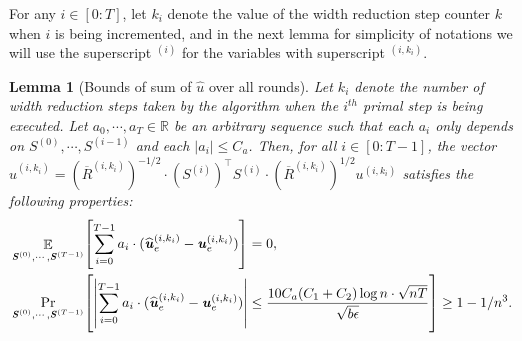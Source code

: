 \documentclass[11pt]{article}
\newtheorem{lemma}[theorem]{Lemma}
\let\originalleft\left
\let\originalright\right
\renewcommand{\left}{\mathopen{}\mathclose\bgroup\originalleft}
\renewcommand{\right}{\aftergroup\egroup\originalright}
\newcommand\uu{\boldsymbol{\mathit{u}}}
\renewcommand\SS{\boldsymbol{\mathit{S}}}
\newcommand\RRbar{\boldsymbol{\overline{\mathit{R}}}}
\newcommand{\wh}{\widehat}
\newcommand\R{\mathbb{R}}
\DeclareMathOperator*{\E}{{\mathbb{E}}}
\begin{document}
For any $i \in [0:T]$, let $k_i$ denote the value of the width reduction step counter $k$ when $i$ is being incremented, and in the next lemma for simplicity of notations we will use the superscript $^{(i)}$ for the variables with superscript $^{(i,k_i)}$.
\begin{lemma}[Bounds of sum of $\wh{\uu}$ over all rounds]\label{lem:sum_hat_u}
Let $k_i$ denote the number of width reduction steps taken by the algorithm when the $i^{th}$ primal step is being executed. Let $a_0, \cdots, a_T \in \R$ be an arbitrary sequence such that each $a_i$ only depends on $\SS^{(0)}, \cdots, \SS^{(i-1)}$ and each $|a_i| \leq C_a$. Then, for all $i \in [0:T-1]$, the vector $\wh{\uu}^{(i,k_i)} = (\RRbar^{(i,k_i)})^{-1/2} \cdot (\SS^{(i)})^{\top} \SS^{(i)} \cdot (\RRbar^{(i,k_i)})^{1/2} \uu^{(i,k_i)}$ satisfies the following properties: 
\begin{align*}
& \E_{\SS^{(0)},\cdots,\SS^{(T-1)}}\left[\sum_{i=0}^{T-1} a_i \cdot (\wh{\uu}^{(i,k_i)}_e - \uu^{(i,k_i)}_e)\right] = 0, \\
& \Pr_{\SS^{(0)},\cdots,\SS^{(T-1)}}\left[ \left|\sum_{i=0}^{T-1} a_i \cdot (\wh{\uu}^{(i,k_i)}_e - \uu^{(i,k_i)}_e)\right| \leq \frac{10 C_a (C_1 + C_2) \log n \cdot \sqrt{nT}}{\sqrt{b \epsilon}} \right] \geq 1 - 1/n^3.
\end{align*}
\end{lemma}
\end{document}
